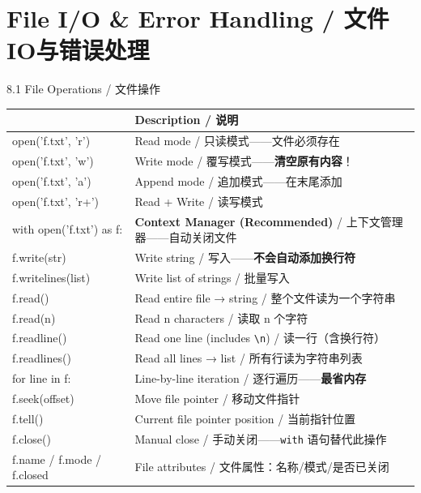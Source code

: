 \documentclass[11pt,a4paper]{report}
\let\oldtexttt\texttt
\renewcommand{\texttt}[1]{\textcolor{mainblue}{\oldtexttt{#1}}}
\begin{document}
\newpage

\chapter{File I/O \& Error Handling / 文件IO与错误处理}

\begin{cmdsection}{8.1  File Operations / 文件操作}
\normalsize\renewcommand{\arraystretch}{1.4}
\centering
\begin{tabularx}{\textwidth}{@{}>{\ttfamily}l>{\raggedright\arraybackslash}X@{}}
\toprule
\multicolumn{1}{@{}l}{\textbf{Syntax}} & \textbf{Description / 说明} \\ \midrule
open('f.txt', 'r')          & Read mode / 只读模式——文件必须存在 \\
open('f.txt', 'w')          & Write mode / 覆写模式——\textbf{清空原有内容}！ \\
open('f.txt', 'a')          & Append mode / 追加模式——在末尾添加 \\
open('f.txt', 'r+')         & Read + Write / 读写模式 \\
with open('f.txt') as f:    & \textbf{Context Manager (Recommended)} / 上下文管理器——自动关闭文件 \\
f.write(str)                & Write string / 写入——\textbf{不会自动添加换行符} \\
f.writelines(list)          & Write list of strings / 批量写入 \\
f.read()                    & Read entire file → string / 整个文件读为一个字符串 \\
f.read(n)                   & Read n characters / 读取 n 个字符 \\
f.readline()                & Read one line (includes \texttt{\textbackslash n}) / 读一行（含换行符） \\
f.readlines()               & Read all lines → list / 所有行读为字符串列表 \\
for line in f:              & Line-by-line iteration / 逐行遍历——\textbf{最省内存} \\
f.seek(offset)              & Move file pointer / 移动文件指针 \\
f.tell()                    & Current file pointer position / 当前指针位置 \\
f.close()                   & Manual close / 手动关闭——\texttt{with} 语句替代此操作 \\
f.name / f.mode / f.closed  & File attributes / 文件属性：名称/模式/是否已关闭 \\
\bottomrule
\end{tabularx}
\end{cmdsection}
\end{document}
